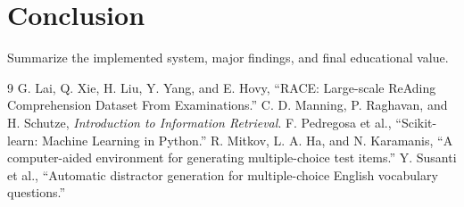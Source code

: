 \documentclass[11pt]{article}
\begin{document}
\section{Conclusion}
Summarize the implemented system, major findings, and final educational value.

\begin{thebibliography}{9}
 G. Lai, Q. Xie, H. Liu, Y. Yang, and E. Hovy, ``RACE: Large-scale ReAding Comprehension Dataset From Examinations.''
 C. D. Manning, P. Raghavan, and H. Schutze, \textit{Introduction to Information Retrieval}.
 F. Pedregosa et al., ``Scikit-learn: Machine Learning in Python.''
 R. Mitkov, L. A. Ha, and N. Karamanis, ``A computer-aided environment for generating multiple-choice test items.''
 Y. Susanti et al., ``Automatic distractor generation for multiple-choice English vocabulary questions.''
\end{thebibliography}
\end{document}

